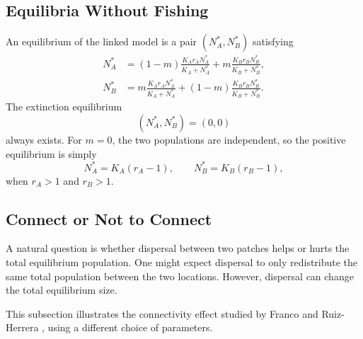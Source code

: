 \documentclass{article}
\numberwithin{equation}{section}
\begin{document}
\subsection{Equilibria Without Fishing}
An equilibrium of the linked model is a pair $(N_A^*,N_B^*)$ satisfying
\begin{equation*}
    \begin{aligned}
        N_A^*
            &= (1-m)\frac{K_A r_A N_A^*}{K_A+N_A^*}
               + m\frac{K_B r_B N_B^*}{K_B+N_B^*},\\
        N_B^*
            &= m\frac{K_A r_A N_A^*}{K_A+N_A^*}
               + (1-m)\frac{K_B r_B N_B^*}{K_B+N_B^*}.
    \end{aligned}
\end{equation*}
The extinction equilibrium
\begin{equation*}
    (N_A^*,N_B^*)=(0,0)
\end{equation*}
always exists.
For $m=0$, the two populations are independent, so the positive
equilibrium is simply
\begin{equation*}
    N_A^*=K_A(r_A-1),
    \qquad
    N_B^*=K_B(r_B-1),
\end{equation*}
when $r_A>1$ and $r_B>1$.
\subsection{Connect or Not to Connect}
A natural question is whether dispersal between two patches helps or hurts
the total equilibrium population. One might expect dispersal to only
redistribute the same total population between the two locations.
However, dispersal can change the total equilibrium size.

This subsection illustrates the connectivity effect studied by Franco and
Ruiz-Herrera \cite{franco-ruiz-herrera-2015}, using a different choice of
parameters.
\end{document}
